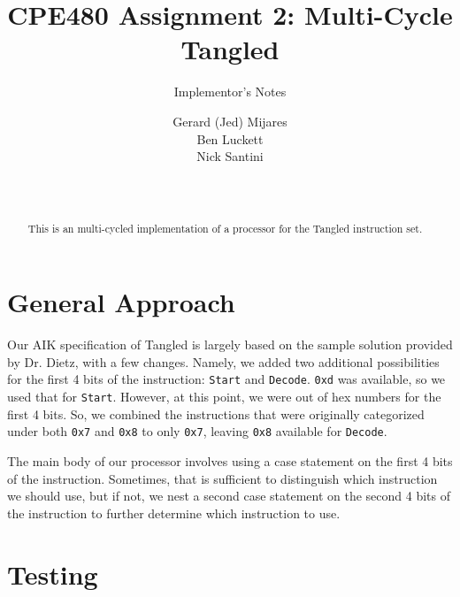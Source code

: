 \documentclass{sig-alternate-05-2015}
\begin{document}

\title{CPE480 Assignment 2: Multi-Cycle Tangled }
\subtitle{Implementor's Notes}

\author{
Gerard (Jed) Mijares\\
Ben Luckett\\
Nick Santini\\
       \\
       \\
}


\maketitle
\begin{abstract}
This is an multi-cycled implementation of a processor for the Tangled instruction set.
\end{abstract}

\section{General Approach}

Our AIK specification of Tangled is largely based on the sample solution provided by Dr. Dietz, with a few changes. Namely, we added two additional possibilities for the first 4 bits of the instruction: \texttt{Start} and \texttt{Decode}. \texttt{0xd} was available, so we used that for \texttt{Start}. However, at this point, we were out of hex numbers for the first 4 bits. So, we combined the instructions that were originally categorized under both \texttt{0x7} and \texttt{0x8} to only \texttt{0x7}, leaving \texttt{0x8} available for \texttt{Decode}.

The main body of our processor involves using a case statement on the first 4 bits of the instruction. Sometimes, that is sufficient to distinguish which instruction we should use, but if not, we nest a second case statement on the second 4 bits of the instruction to further determine which instruction to use.

\vfill\pagebreak

\section{Testing}
\end{document}
